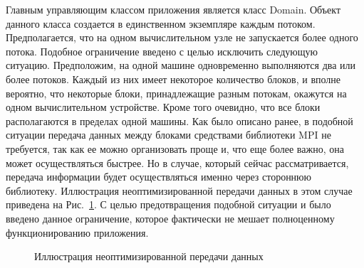 \documentclass[a4paper, 14pt]{extarticle}
\theoremstyle{definition}
\begin{document}
\par Главным управляющим классом приложения является класс Domain. Объект данного класса создается в единственном экземпляре каждым потоком. Предполагается, что на одном вычислительном узле не запускается более одного потока. Подобное ограничение введено с целью исключить следующую ситуацию. Предположим, на одной машине одновременно выполняются два или более потоков. Каждый из них имеет некоторое количество блоков, и вполне вероятно, что некоторые блоки, принадлежащие разным потокам, окажутся на одном вычислительном устройстве. Кроме того очевидно, что все блоки располагаются в пределах одной машины. Как было описано ранее, в подобной ситуации передача данных между блоками средствами библиотеки MPI не требуется, так как ее можно организовать проще и, что еще более важно, она может осуществляться быстрее. Но в случае, который сейчас рассматривается, передача информации будет осуществляться именно через стороннюю библиотеку. Иллюстрация неоптимизированной передачи данных в этом случае приведена на Рис.~\ref{ris:error_ex}. С целью предотвращения подобной ситуации и было введено данное ограничение, которое фактически не мешает полноценному функционированию приложения.
\begin{figure}[h]
	\caption{Иллюстрация неоптимизированной передачи данных}
	\label{ris:error_ex}
\end{figure}
\end{document}
